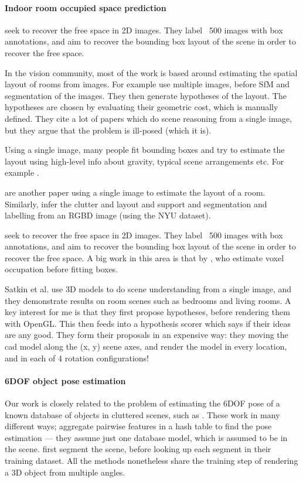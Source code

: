 \documentclass[10pt,a4paper, twocolumn]{article}
\makeatletter
\newcommand*{\ea}{et al.\@\xspace}
\makeatother
\begin{document}
\paragraph{Indoor room occupied space prediction}
\cite{hedau-cvpr-2012} seek to recover the free space in 2D images. They label ~500 images with box annotations, and aim to recover the bounding box layout of the scene in order to recover the free space.

In the vision community, most of the work is based around estimating the spatial layout of rooms from images.
For example \cite{bao-wacv-2014} use multiple images, before SfM and segmentation of the images. 
They then generate hypotheses of the layout. 
The hypotheses are chosen by evaluating their geometric cost, which is manually defined. 
They cite a lot of papers which do scene reasoning from a single image, but they argue that the problem is ill-posed (which it is). 

Using a single image, many people fit bounding boxes and try to estimate the layout using high-level info about gravity, typical scene arrangements etc. 
For example \cite{choi-cvpr-2013}.

\cite{lee-nips-2010} are another paper using a single image to estimate the layout of a room. 
Similarly, \cite{zhang-iccv-2013} infer the clutter and layout and support and segmentation and labelling from an RGBD image (using the NYU dataset).

\cite{hedau-cvpr-2012} seek to recover the free space in 2D images. 
They label ~500 images with box annotations, and aim to recover the bounding box layout of the scene in order to recover the free space. 
A big work in this area is that by \cite{gupta-cvpr-2011}, who estimate voxel occupation before fitting boxes.

Satkin \ea \cite{satkin-bmvc-2012} use 3D models to do scene understanding from a single image, and they demonstrate results on room scenes such as bedrooms and living rooms. 
A key interest for me is that they first propose hypotheses, before rendering them with OpenGL.
This then feeds into a hypothesis scorer which says if their ideas are any good. 
They form their proposals in an expensive way: they moving the cad model along the (x, y) scene axes, and render the model in every location, and in each of 4 rotation configurations!

\paragraph{6DOF object pose estimation}
Our work is closely related to the problem of estimating the 6DOF pose of a known database of objects in cluttered scenes, such as \cite{hinterstoisser-accv-2012, drost-3dimpvt-2012, rusu-iros-2010}. 
These work in many different ways; \cite{drost-3dimpvt-2012} aggregate pairwise features in a hash table to find the pose estimation --- they assume just one database model, which is assumed to be in the scene. \cite{rusu-iros-2010} first segment the scene, before looking up each segment in their training dataset.
All the methods nonetheless share the training step of rendering a 3D object from multiple angles.
\end{document}
